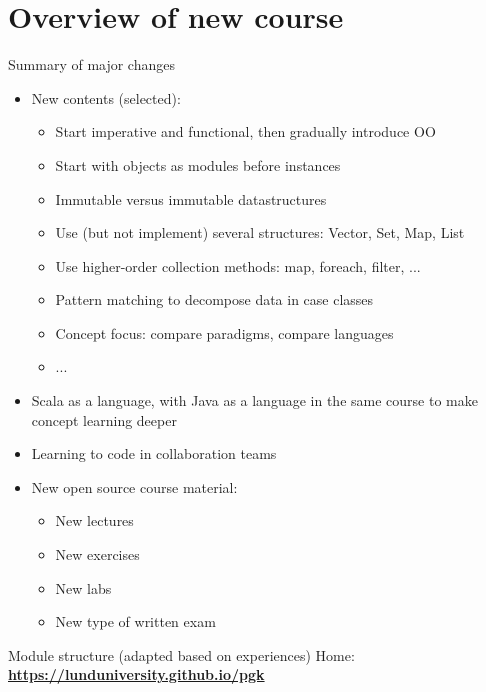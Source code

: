 \documentclass{lecturenotes}
\newcommand{\Section}[1]{\section{#1}\frame{\centering\huge\bfseries\textcolor{blue}{#1}}}
\begin{document}
\Section{Overview of new course}

\begin{Slide}{Summary of major changes}\footnotesize
\begin{itemize}
\item New contents (selected):
\begin{itemize}\footnotesize
\item Start imperative and functional, then gradually introduce OO
\item Start with objects as modules before instances
\item Immutable versus immutable datastructures
\item Use (but not implement) several structures: Vector, Set, Map, List
\item Use higher-order collection methods: map, foreach, filter, ...
\item Pattern matching to decompose data in case classes
\item Concept focus: compare paradigms, compare languages
\item ...
\end{itemize}
\item Scala as a  language, with Java as a  language in the same course to make concept learning deeper
\item Learning to code in collaboration teams
\item New open source course material:
\begin{itemize}\footnotesize
\item New lectures
\item New exercises
\item New labs
\item New type of written exam
\end{itemize}
\end{itemize}
\end{Slide}

\begin{Slide}{Module structure (adapted based on experiences)}
Home: \textbf{\url{https://lunduniversity.github.io/pgk}} \\ \vspace{1em}

\noindent\resizebox{0.8\columnwidth}{!}{\fontsize{8}{10}\selectfont

}
\end{Slide}
\end{document}
